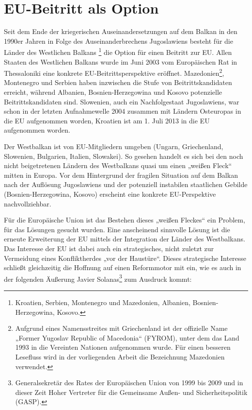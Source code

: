 \chapter{EU-Beitritt als Option}
Seit dem Ende der kriegerischen Auseinandersetzungen auf dem Balkan in den 1990er Jahren in Folge des Auseinanderbrechens Jugoslawiens besteht für die Länder des Westlichen Balkans \footnote{Kroatien, Serbien, Montenegro und Mazedonien, Albanien, Bosnien-Herzegowina, Kosovo.}  die Option für einen Beitritt zur EU. Allen Staaten des Westlichen Balkans wurde im Juni 2003 vom Europäischen Rat in Thessaloniki eine konkrete EU-Beitrittsperspektive eröffnet. Mazedonien\footnote{Aufgrund eines Namensstreites mit Griechenland ist der offizielle Name „Former Yugoslav Republic of Macedonia“ (FYROM), unter dem das Land 1993 in die Vereinten Nationen aufgenommen wurde. Für einen besseren Lesefluss wird in der vorliegenden Arbeit die Bezeichnung Mazedonien verwendet.}, Montenegro und Serbien haben inzwischen die Stufe von Beitrittskandidaten erreicht, während Albanien, Bosnien-Herzegowina und Kosovo potenzielle Beitrittskandidaten sind. Slowenien, auch ein Nachfolgestaat Jugoslawiens, war schon in der letzten Aufnahmewelle 2004 zusammen mit Ländern Osteuropas in die EU aufgenommen worden, Kroatien ist am 1. Juli 2013 in die EU aufgenommen worden.\par

Der Westbalkan ist von EU-Mitgliedern umgeben (Ungarn, Griechenland, Slowenien, Bulgarien, Italien, Slowakei). So gesehen handelt es sich bei den noch nicht beigetretenen Ländern des Westbalkans quasi um einen „weißen Fleck“ mitten in Europa. Vor dem Hintergrund der fragilen Situation auf dem Balkan nach der Auflösung Jugoslawiens und der potenziell instabilen staatlichen Gebilde (Bosnien-Herzegowina, Kosovo) erscheint eine konkrete EU-Perspektive nachvollziehbar.\par

Für die Europäische Union ist das Bestehen dieses „weißen Fleckes“ ein Problem, für das Lösungen gesucht wurden. Eine anscheinend sinnvolle Lösung ist die erneute Erweiterung der EU mittels der Integration der Länder des Westbalkans. Das Interesse der EU ist dabei auch ein strategisches, nicht zuletzt zur Vermeidung eines Konfliktherdes „vor der Haustüre“. Dieses strategische Interesse schließt gleichzeitig die Hoffnung auf einen Reformmotor mit ein, wie es auch in der folgenden Äußerung Javier Solanas\footnote{Generalsekretär des Rates der Europäischen Union von 1999 bis 2009 und in dieser Zeit Hoher Vertreter für die Gemeinsame Außen- und Sicherheitspolitik (GASP).} zum Ausdruck kommt:\par

